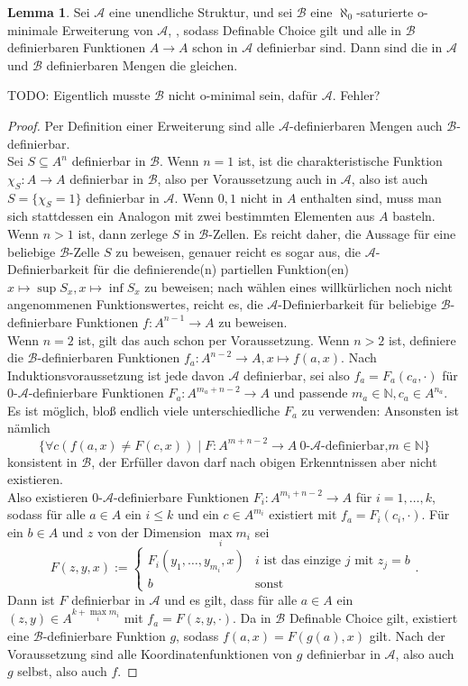 \documentclass[a4paper, 11pt]{report}
\newcommand{\fA}{\mathcal{A}}
\newcommand{\fB}{\mathcal{B}}
\newcommand{\setN}{\mathbb{N}}
\theoremstyle{definition}
\newtheorem{lemma}[subsection]{Lemma}
\begin{document}
\begin{lemma}\label{Erweiterung definierbare Mengen}
	Sei $\fA$ eine unendliche Struktur, und sei $\fB$ eine $\aleph_0$-saturierte o-minimale Erweiterung von $\fA$, , sodass Definable Choice gilt und alle in $\fB$ definierbaren Funktionen $A\rightarrow A$ schon in $\fA$ definierbar sind. Dann sind die in $\fA$ und $\fB$ definierbaren Mengen die gleichen.
\end{lemma}
TODO: Eigentlich musste $\fB$ nicht o-minimal sein, dafür $\fA$. Fehler?
\begin{proof}
	Per Definition einer Erweiterung sind alle $\fA$-definierbaren Mengen auch $\fB$-definierbar.\\
	Sei $S\subseteq A^n$ definierbar in $\fB$. Wenn $n=1$ ist, ist die charakteristische Funktion $\chi_S:A\rightarrow A$ definierbar in $\fB$, also per Voraussetzung auch in $\fA$, also ist auch $S=\{\chi_S=1\}$ definierbar in $\fA$. Wenn $0,1$ nicht in $A$ enthalten sind, muss man sich stattdessen ein Analogon mit zwei bestimmten Elementen aus $A$ basteln.\\
	Wenn $n>1$ ist, dann zerlege $S$ in $\fB$-Zellen. Es reicht daher, die Aussage für eine beliebige $\fB$-Zelle $S$ zu beweisen, genauer reicht es sogar aus, die $\fA$-Definierbarkeit für die definierende(n) partiellen Funktion(en) $x\mapsto\sup S_x,x\mapsto\inf S_x$ zu beweisen; nach wählen eines willkürlichen noch nicht angenommenen Funktionswertes, reicht es, die $\fA$-Definierbarkeit für beliebige $\fB$-definierbare Funktionen $f:A^{n-1}\rightarrow A$ zu beweisen.\\
	Wenn $n=2$ ist, gilt das auch schon per Voraussetzung. Wenn $n>2$ ist, definiere die $\fB$-definierbaren Funktionen $f_a:A^{n-2}\rightarrow A,x\mapsto f(a,x)$. Nach Induktionsvoraussetzung ist jede davon $\fA$ definierbar, sei also $f_a=F_a(c_a,\cdot)$ für 0-$\fA$-definierbare Funktionen $F_a:A^{m_a+n-2}\rightarrow A$ und passende $m_a\in\setN,c_a\in A^{n_a}$. Es ist möglich, bloß endlich viele unterschiedliche $F_a$ zu verwenden: Ansonsten ist nämlich $$\{\forall c(f(a,x)\neq F(c,x))\mid F:A^{m+n-2}\rightarrow A\ \text{0-}\fA\text{-definierbar,}m\in\setN\}$$ konsistent in $\fB$, der Erfüller davon darf nach obigen Erkenntnissen aber nicht existieren.\\
	Also existieren 0-$\fA$-definierbare Funktionen $F_i:A^{m_i+n-2}\rightarrow A$ für $i=1,\dots,k$, sodass für alle $a\in A$ ein $i\leq k$ und ein $c\in A^{m_i}$ existiert mit $f_a=F_i(c_i,\cdot)$. Für ein $b\in A$ und $z$ von der Dimension $\max\limits_i m_i$ sei
	$$F(z,y,x):=\left\{\begin{array}{ll}
	F_i(y_1,\dots,y_{m_i},x)&i\text{ ist das einzige }j\text{ mit }z_j=b\\
	b&\text{sonst}
	\end{array}\right..$$
	Dann ist $F$ definierbar in $\fA$ und es gilt, dass für alle $a\in A$ ein $(z,y)\in A^{k+\max\limits_i m_i}$ mit $f_a=F(z,y,\cdot)$. Da in $\fB$ Definable Choice gilt, existiert eine $\fB$-definierbare Funktion $g$, sodass $f(a,x)=F(g(a),x)$ gilt. Nach der Voraussetzung sind alle Koordinatenfunktionen von $g$ definierbar in $\fA$, also auch $g$ selbst, also auch $f$.
\end{proof}
\end{document}
